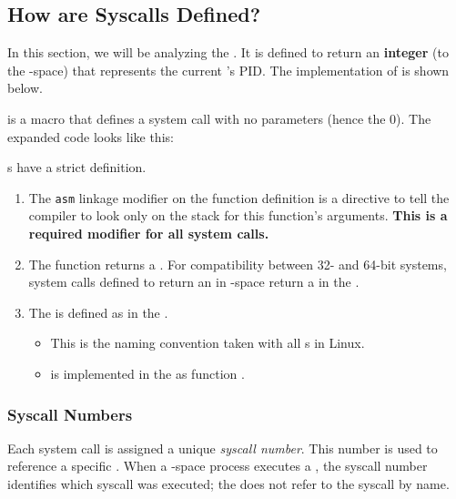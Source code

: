 \subsection{How are Syscalls Defined?}\label{subsec:How_Syscalls_Defined}
In this section, we will be analyzing the  .
It is defined to return an \textbf{integer} (to the -space) that represents the current 's PID.\@
The implementation of  is shown below.

 is a macro that defines a system call with no parameters (hence the 0).
The expanded code looks like this:

s have a strict definition.
\begin{enumerate}[noitemsep]
\item The \texttt{asm} linkage modifier on the function definition is a directive to tell the compiler to look only on the stack for this function’s arguments.
  \textbf{This is a required modifier for all system calls.}
\item The function returns a .
  For compatibility between 32- and 64-bit systems, system calls defined to return an  in -space return a  in the .
\item The   is defined as  in the .
  \begin{itemize}[noitemsep]
  \item This is the naming convention taken with all s in Linux.
  \item {}  is implemented in the  as function .
  \end{itemize}
\end{enumerate}

\subsubsection{Syscall Numbers}\label{subsubsec:Syscall_Numbers}
\begin{definition}\label{def:Syscall_Number}
  Each system call is assigned a unique \emph{syscall number}.
  This number is used to reference a specific .
  When a -space process executes a , the syscall number identifies which syscall was executed; the  does not refer to the syscall by name.
\end{definition}

